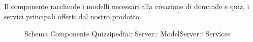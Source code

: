 \subsection{}
Il componente racchiude i modelli necessari alla creazione di domande e quiz, i servizi principali offerti dal nostro prodotto.
\begin{figure}[H]
\centering
\noindent{}
\caption[Schema Componente Services]{Schema Componente Quizzipedia:: Server:: ModelServer:: Services}
\end{figure}
